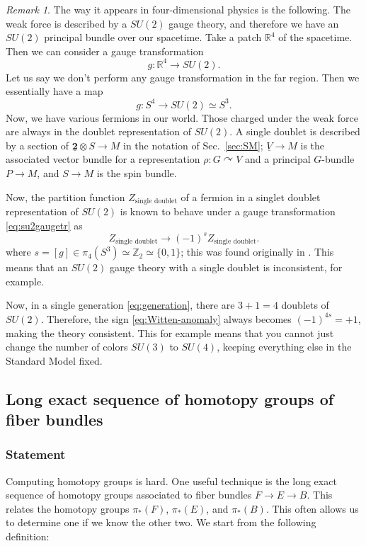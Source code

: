 \documentclass[12pt]{article}
\numberwithin{equation}{section}
\numberwithin{figure}{section}
\theoremstyle{remark}
\newtheorem{remark}[definition]{Remark}
\def\bR{\mathbb{R}}
\def\bZ{\mathbb{Z}}
\begin{document}
\begin{remark}
The way it appears in four-dimensional physics is the following.
The weak force is described by a $SU(2)$ gauge theory,
and therefore we have an $SU(2)$ principal bundle over our spacetime.
Take a patch $\bR^4$ of the spacetime.
Then we can consider a gauge transformation \begin{equation}
  g:\bR^4\to SU(2).
\end{equation}
Let us say we don't perform any gauge transformation in the far region.
Then we essentially have a map \begin{equation}
g: S^4\to SU(2) \simeq S^3. \label{eq:su2gaugetr}
\end{equation}
Now, we have various fermions in our world.
Those charged under the weak force 
are always in the doublet representation of $SU(2)$.
A single doublet is described by a section of $\underline{\mathbf{2}}\otimes S\to M$ 
in the notation of Sec.~\ref{sec:SM};
$\underline{V}\to M$ 
is the associated vector bundle
for a representation $\rho: G \curvearrowright V$
and a principal $G$-bundle $P\to M$,
and $S\to M$ is the spin bundle.

Now, the partition function $Z_\text{single doublet}$ of a fermion in a singlet doublet representation 
of $SU(2)$ 
is known to behave under 
a gauge transformation \eqref{eq:su2gaugetr} as \begin{equation}
  Z_\text{single doublet} \to (-1)^s Z_\text{single doublet}.\label{eq:Witten-anomaly}
\end{equation}
where $s=[g] \in \pi_4(S^3) \simeq \bZ_2 \simeq \{0,1\}$;
this was found originally in \cite{Witten:1982fp}.
This means that an $SU(2)$ gauge theory with a single doublet is inconsistent, for example.

Now, in a single generation \eqref{eq:generation},
there are $3+1=4$ doublets of $SU(2)$.
Therefore, the sign \eqref{eq:Witten-anomaly} always becomes $(-1)^{4s}=+1$,
making the theory consistent.
This for example means that you cannot just change the number of colors $SU(3)$ to $SU(4)$, 
keeping everything else in the Standard Model fixed.
\end{remark}


\subsection{Long exact sequence of homotopy groups of fiber bundles}
\subsubsection{Statement}
Computing homotopy groups is hard. 
One useful technique is the long exact sequence of homotopy groups
associated to fiber bundles $F\to E\to B$.
This relates the homotopy groups  $\pi_*(F)$, $\pi_*(E)$, and $\pi_*(B)$.
This often allows us to determine one if we know the other two.
We start from the following definition:
\end{document}
